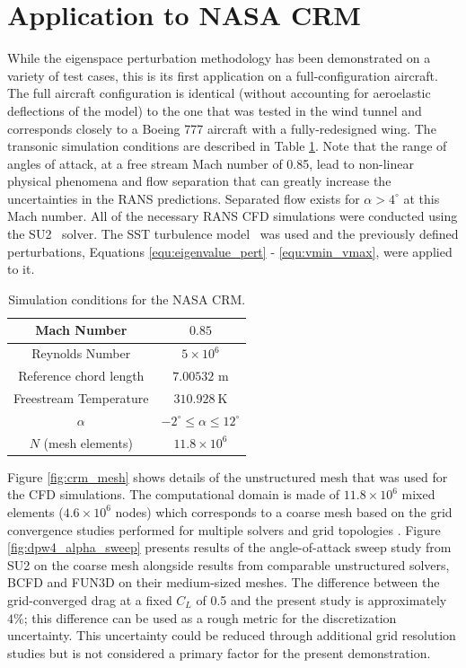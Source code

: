 \section{Application to NASA CRM} \label{sec:crm_rans_uq}

While the eigenspace perturbation methodology has been demonstrated on a variety of test cases, this is its first application on a full-configuration aircraft. The full aircraft configuration is identical (without accounting for aeroelastic deflections of the model) to the one that was tested in the wind tunnel and corresponds closely to a Boeing 777 aircraft with a fully-redesigned wing. The transonic simulation conditions are described in Table \ref{NASA_CRM_test_cond}. Note that the range of angles of attack, at a free stream Mach number of 0.85, lead to non-linear physical phenomena and flow separation that can greatly increase the uncertainties in the RANS predictions. Separated flow exists for $\alpha > 4^\circ$ at this Mach number. All of the necessary RANS CFD simulations were conducted using the SU2~\cite{su2_aiaajournal} solver. The SST turbulence model~\cite{menter1994two,menter2003ten} was used and the previously defined perturbations, Equations \eqref{equ:eigenvalue_pert} - \eqref{equ:vmin_vmax}, were applied to it. 

\begin{table}
\centering
    \captionsetup{justification=centering}
    \caption{Simulation conditions for the NASA CRM.} 
    \begin{tabular}{|c|c|}
        \hline
        Mach Number & $0.85$ \\ \hline
        Reynolds Number & $5\times10^6$ \\ \hline
        Reference chord length & $7.00532$ m \\ \hline
        Freestream Temperature & $310.928~\text{K}$ \\ \hline
        $\alpha$ & $-2^\circ \leq \alpha \leq 12^\circ$ \\ \hline 
        $N$ (mesh elements) &  $11.8\times10^6$ \\ \hline
    \end{tabular}
    \label{NASA_CRM_test_cond}
\end{table}

Figure \ref{fig:crm_mesh} shows details of the unstructured mesh that was used for the CFD simulations. The computational domain is made of $11.8\times10^6$ mixed elements ($4.6\times10^6$ nodes) which corresponds to a coarse mesh based on the grid convergence studies performed for multiple solvers and grid topologies \cite{vassberg_summary_2010}. Figure \ref{fig:dpw4_alpha_sweep} presents results of the angle-of-attack sweep study from SU2 on the coarse mesh alongside results from comparable unstructured solvers, BCFD \cite{winkler_dorgan_cary_mani_2009} and FUN3D \cite{lee-rausch_application_2014} on their medium-sized meshes. 
The difference between the grid-converged drag at a fixed $C_L$ of 0.5 and the present study is approximately $4\%$; this difference can be used as a rough metric for the discretization uncertainty. This uncertainty could be reduced through additional grid resolution studies but is not considered a primary factor for the present demonstration.

